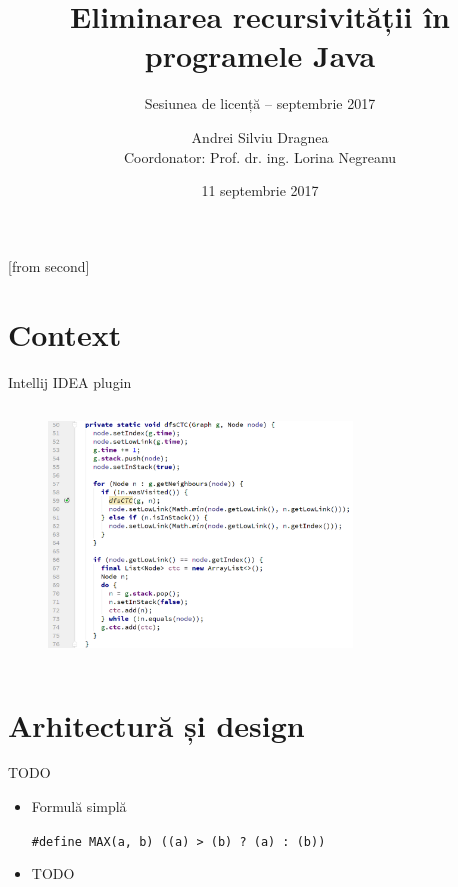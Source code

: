 \documentclass{beamer}
\title[Eliminarea recursivității în programele Java]{Eliminarea recursivității în programele Java}
\subtitle{Sesiunea de licență -- septembrie 2017}
\institute{Facultatea de Automatică și Calculatoare,\\
	Universitatea POLITEHNICA București}
\author[Andrei Silviu Dragnea]{Andrei Silviu Dragnea\\
	Coordonator: Prof. dr. ing. Lorina Negreanu}
\date{11 septembrie 2017}
\begin{document}
[from second]


\frame{\titlepage}

\frame{\tableofcontents}

\section{Context}

\begin{frame}{Intellij IDEA plugin}
    \begin{columns}[T]
        \begin{column}{\textwidth}
            \begin{figure}
                \includegraphics[height=6cm]{img/highlight}
            \end{figure}
        \end{column}
    \end{columns}
\end{frame}

\section{Arhitectură și design}

\begin{frame}{TODO}
	\begin{itemize}
		\item Formulă simplă
			\begin{beamerboxesrounded}[lower=block body,shadow=true]{}
				\texttt{\#define MAX(a, b)   ((a) > (b) ? (a) : (b))}
			\end{beamerboxesrounded}
		\item TODO
	\end{itemize}
\end{frame}
\end{document}
